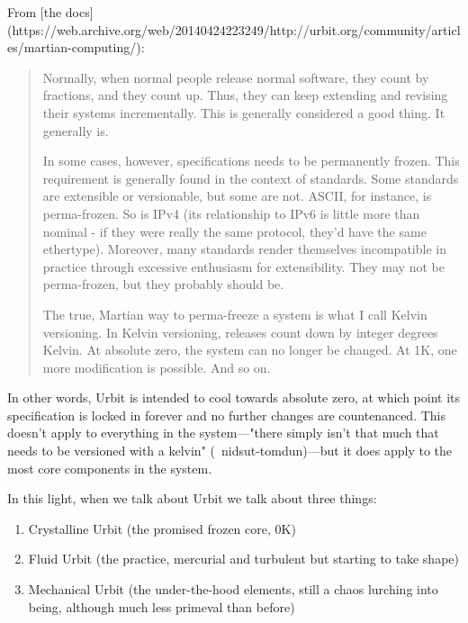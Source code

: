 {{{{
From [the docs](https://web.archive.org/web/20140424223249/http://urbit.org/community/articles/martian-computing/):

\begin{quote}
Normally, when normal people release normal software, they count by fractions, and they count up. Thus, they can keep extending and revising their systems incrementally. This is generally considered a good thing. It generally is.

In some cases, however, specifications needs to be permanently frozen. This requirement is generally found in the context of standards. Some standards are extensible or versionable, but some are not. ASCII, for instance, is perma-frozen. So is IPv4 (its relationship to IPv6 is little more than nominal - if they were really the same protocol, they'd have the same ethertype). Moreover, many standards render themselves incompatible in practice through excessive enthusiasm for extensibility. They may not be perma-frozen, but they probably should be.

The true, Martian way to perma-freeze a system is what I call Kelvin versioning. In Kelvin versioning, releases count down by integer degrees Kelvin. At absolute zero, the system can no longer be changed. At 1K, one more modification is possible. And so on.
\end{quote}

In other words, Urbit is intended to cool towards absolute zero, at which point its specification is locked in forever and no further changes are countenanced.  This doesn't apply to everything in the system—"there simply isn't that much that needs to be versioned with a kelvin" (~nidsut-tomdun)—but it does apply to the most core components in the system.

In this light, when we talk about Urbit we talk about three things:
\begin{enumerate}
	\item  Crystalline Urbit (the promised frozen core, 0K)
  \item  Fluid Urbit (the practice, mercurial and turbulent but starting to take shape)
  \item  Mechanical Urbit (the under-the-hood elements, still a chaos lurching into being, although much less primeval than before)
\end{enumerate}


}}}}

